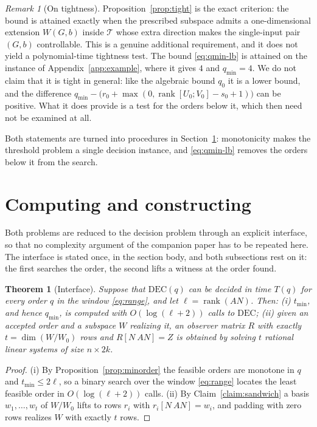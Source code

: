 ﻿\documentclass[journal]{IEEEtran}
\theoremstyle{plainn}
\newtheorem{thm}{Theorem}
\theoremstyle{remark}
\newtheorem{remark}{Remark}
\begin{document}
\begin{remark}[On tightness]\label{rem:lbtight}
Proposition~\ref{prop:tight} is the exact criterion: the bound is attained exactly when the
prescribed subspace admits a one-dimensional extension $W(G,b)$ inside $\mathcal T$ whose extra
direction makes the single-input pair $(G,b)$ controllable. This is a genuine additional requirement,
and it does not yield a polynomial-time tightness test. The bound \eqref{eq:qmin-lb} is attained on the
instance of Appendix~\ref{app:example}, where it gives
$4$ and $q_{\min}=4$. We do not claim that it is tight in general: like the algebraic bound $q_0$ it is
a lower bound, and the difference
$q_{\min}-\bigl(r_0+\max(0,\operatorname{rank}[U_0;V_0]-s_0+1)\bigr)$ can be positive. What it does
provide is a test for the orders below it, which then need not be examined at all.
\end{remark}

Both statements are turned into procedures in Section~\ref{sec:compute}: monotonicity makes the
threshold problem a single decision instance, and \eqref{eq:qmin-lb} removes the orders below it from
the search.

\section{Computing and constructing}\label{sec:compute}

Both problems are reduced to the decision problem through an explicit interface, so that no complexity
argument of the companion paper has to be repeated here. The interface is stated once, in the section
body, and both subsections rest on it: the first searches the order, the second lifts a witness at the
order found.

\begin{thm}[Interface]\label{thm:interface}
Suppose that $\mathrm{DEC}(q)$ can be decided in time $T(q)$ for every order $q$ in the window
\eqref{eq:range}, and let $\ell=\operatorname{rank}(AN)$. Then:
\emph{(i)} $t_{\min}$, and hence $q_{\min}$, is computed with $O(\log(\ell+2))$ calls to $\mathrm{DEC}$;
\emph{(ii)} given an accepted order and a subspace $W$ realizing it, an observer matrix $R$ with exactly
$t=\dim(W/W_0)$ rows and $R[N\ AN]=Z$ is obtained by solving $t$ rational linear systems of size
$n\times2k$.
\end{thm}

\begin{proof}
(i) By Proposition~\ref{prop:minorder} the feasible orders are monotone in $q$ and $t_{\min}\le2\ell$,
so a binary search over the window \eqref{eq:range} locates the least feasible order in
$O(\log(\ell+2))$ calls. (ii) By Claim~\ref{claim:sandwich} a basis $w_1,\dots,w_t$ of $W/W_0$ lifts to rows $r_i$ with
$r_i[N\ AN]=w_i$, and padding with zero rows realizes $W$ with exactly $t$ rows.
\end{proof}
\end{document}

